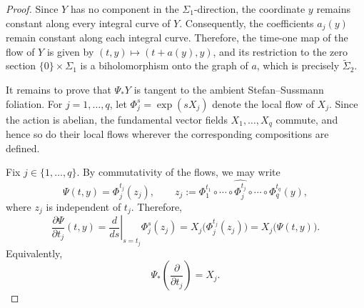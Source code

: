 \documentclass[11pt]{amsart}
\theoremstyle{definition}
\theoremstyle{remark}
\begin{document}
\begin{proof}
	Since $Y$ has no component in the $\Sigma_1$-direction, the coordinate $y$ remains constant along every integral curve of $Y$.
	Consequently, the coefficients $a_j(y)$ remain constant along each integral curve.
	Therefore, the time-one map of the flow of $Y$ is given by $(t,y)\mapsto(t+a(y),y)$, and its restriction to the zero section $\{0\}\times\Sigma_1$ is a biholomorphism onto the graph of $a$, which is precisely $\widetilde{\Sigma}_2$.


It remains to prove that $\Psi_*Y$ is tangent to the ambient
Stefan--Sussmann foliation. For $j=1,\ldots,q$, let
$\Phi_j^s=\exp(sX_j)$ denote the local flow of $X_j$. Since the action
is abelian, the fundamental vector fields $X_1,\ldots,X_q$ commute,
and hence so do their local flows wherever the corresponding
compositions are defined.

 
Fix $j\in\{1,\ldots,q\}$. By commutativity of the flows, we may write
\[
    \Psi(t,y)=\Phi_j^{t_j}(z_j),
    \qquad
    z_j:=
    \Phi_1^{t_1}\circ\cdots\circ
    \widehat{\Phi_j^{t_j}}\circ\cdots\circ
    \Phi_q^{t_q}(y),
\]
where $z_j$ is independent of $t_j$. Therefore,
\[
    \frac{\partial\Psi}{\partial t_j}(t,y)
    =
    \left.\frac{d}{ds}\right|_{s=t_j}\Phi_j^s(z_j)
    =
    X_j\bigl(\Phi_j^{t_j}(z_j)\bigr)
    =
    X_j\bigl(\Psi(t,y)\bigr).
\]
Equivalently,
\[
    \Psi_*\!\left(\frac{\partial}{\partial t_j}\right)=X_j.
\]


\end{proof}
\end{document}
